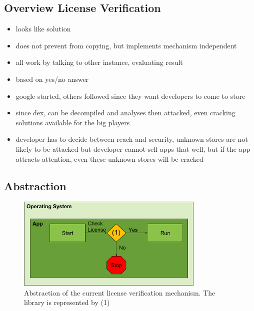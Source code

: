 \subsection{Overview License Verification}
\begin{itemize}
  \item looks like solution
  \item does not prevent from copying, but implements mechanism independent
  \item all work by talking to other instance, evaluating result
  \item based on yes/no answer
  \item google started, others followed since they want developers to come to store
  \item since dex, can be decompiled and analyses then attacked, even cracking solutions available for the big players
  \item developer has to decide between reach and security, unknown stores are not likely to be attacked but developer cannot sell apps that well, but if the app attracts attention, even these unknown stores will be cracked
\end{itemize}

\subsection{Abstraction} \label{section:license-abstraction}
\begin{figure}[h]
    \centering
    \includegraphics[width=0.8\textwidth]{data/verificationNow.png}
    \caption{Abstraction of the current license verification mechanism. The library is represented by (1)}
    \label{fig:verificationNow}
\end{figure}

